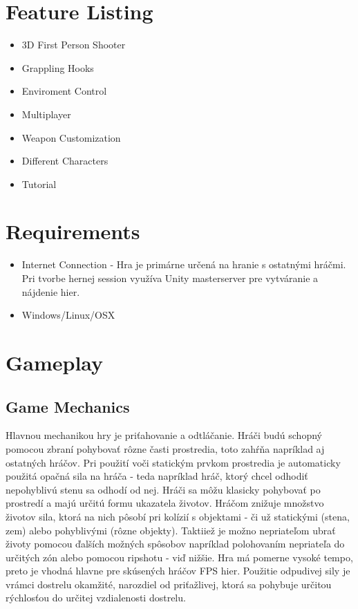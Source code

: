\documentclass[a4paper]{report}
\begin{document}
\chapter{Feature Listing}
\begin{itemize}
  \item 3D First Person Shooter
  \item Grappling Hooks
  \item Enviroment Control
  \item Multiplayer
  \item Weapon Customization
  \item Different Characters
  \item Tutorial
\end{itemize}

\chapter{Requirements}
\begin{itemize}
  \item Internet Connection - Hra je primárne určená na hranie s ostatnými hráčmi. Pri tvorbe hernej session využíva Unity masterserver pre vytváranie a nájdenie hier.
  \item Windows/Linux/OSX
\end{itemize}


\chapter{Gameplay}
\section{Game Mechanics}
 Hlavnou mechanikou hry je priťahovanie a odtláčanie. Hráči budú schopný pomocou zbraní pohybovať rôzne časti prostredia, toto zahŕňa napríklad aj ostatných hráčov. Pri použití voči statickým prvkom prostredia je automaticky použitá opačná sila na hráča - teda napríklad hráč, ktorý chcel odhodiť nepohyblivú stenu sa odhodí od nej. Hráči sa môžu klasicky pohybovať po prostredí a majú určitú formu ukazatela životov. Hráčom znižuje množstvo životov sila, ktorá na nich pôsobí pri kolízií s objektami - či už statickými (stena, zem) alebo pohyblivými (rôzne objekty). Taktiiež je možno nepriateľom ubrať životy pomocou ďalších možných spôsobov napríklad polohovaním nepriateľa do určitých zón alebo pomocou ripshotu - viď nižšie.  Hra má pomerne vysoké tempo, preto je vhodná hlavne pre skúsených hráčov FPS hier. Použitie odpudivej sily je vrámci dostrelu okamžité, narozdiel od priťažlivej, ktorá sa pohybuje určitou rýchlosťou do určitej vzdialenosti dostrelu.
\end{document}
